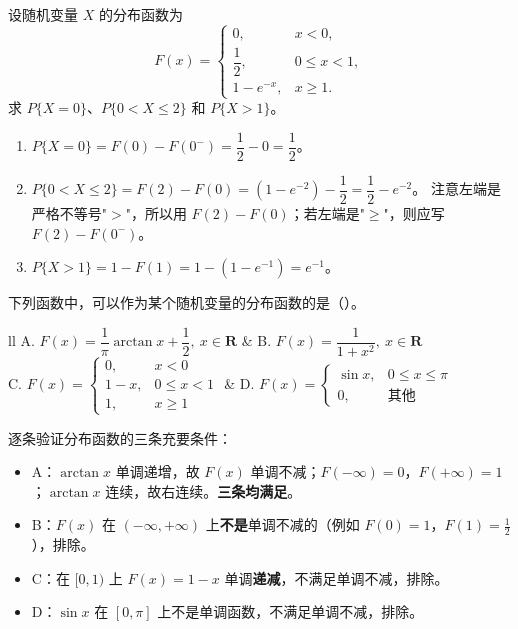 \documentclass[lang=cn,11pt]{elegantbook}
\begin{document}
\begin{exercise}\label{exer:2-1}
设随机变量 \(X\) 的分布函数为
\[
F(x) = \begin{cases}
0, & x < 0, \\
\dfrac{1}{2}, & 0 \le x < 1, \\
1 - e^{-x}, & x \ge 1.
\end{cases}
\]
求 \(P\{X = 0\}\)、\(P\{0 < X \le 2\}\) 和 \(P\{X > 1\}\)。
\end{exercise}

\begin{solution}
\begin{enumerate}
    \item \(P\{X = 0\} = F(0) - F(0^-) = \dfrac{1}{2} - 0 = \dfrac{1}{2}\)。
    \item \(P\{0 < X \le 2\} = F(2) - F(0) = (1 - e^{-2}) - \dfrac{1}{2} = \dfrac{1}{2} - e^{-2}\)。
    注意左端是严格不等号"$>$"，所以用 $F(2) - F(0)$；若左端是"$\geqslant$"，则应写 $F(2) - F(0^-)$。
    \item \(P\{X > 1\} = 1 - F(1) = 1 - (1 - e^{-1}) = e^{-1}\)。
\end{enumerate}
\end{solution}

\begin{exercise}\label{exer:2-2}
下列函数中，可以作为某个随机变量的分布函数的是（\quad）。\par
\begin{tabular}{ll}
A. \(F(x) = \dfrac{1}{\pi}\arctan x + \dfrac{1}{2},\ x \in \mathbf{R}\) & B. \(F(x) = \dfrac{1}{1+x^2},\ x \in \mathbf{R}\) \\
C. \(F(x) = \begin{cases} 0, & x < 0 \\ 1-x, & 0 \le x < 1 \\ 1, & x \ge 1 \end{cases}\) & D. \(F(x) = \begin{cases} \sin x, & 0 \le x \le \pi \\ 0, & \text{其他} \end{cases}\)
\end{tabular}
\end{exercise}

\begin{solution}
逐条验证分布函数的三条充要条件：
\begin{itemize}
    \item A：\(\arctan x\) 单调递增，故 \(F(x)\) 单调不减；\(F(-\infty)=0\)，\(F(+\infty)=1\)；\(\arctan x\) 连续，故右连续。\textbf{三条均满足}。
    \item B：\(F(x)\) 在 \((-\infty,+\infty)\) 上\textbf{不是}单调不减的（例如 \(F(0)=1\)，\(F(1)=\frac{1}{2}\)），排除。
    \item C：在 \([0,1)\) 上 \(F(x)=1-x\) 单调\textbf{递减}，不满足单调不减，排除。
    \item D：\(\sin x\) 在 \([0,\pi]\) 上不是单调函数，不满足单调不减，排除。
\end{itemize}
\end{solution}
\end{document}
